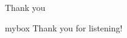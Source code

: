 \documentclass[10pt,aspectratio=43,mathserif,table]{beamer}
\begin{document}
\begin{frame}{Thank you}
\begin{center}
\begin{minipage}{1\textwidth}
 \begin{beamercolorbox}[wd=0.70\textwidth, rounded=true, shadow=true]{mybox}
\LARGE \centering Thank you for listening!  %
\end{beamercolorbox}
 \end{minipage}
\end{center}
\end{frame}


\end{document}
